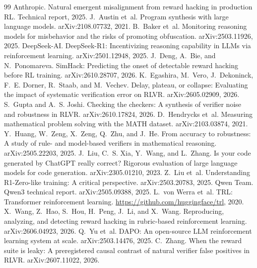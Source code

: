 \documentclass[11pt]{article}
\begin{document}

\begin{thebibliography}{99}
 Anthropic. Natural emergent misalignment from reward hacking in production RL. Technical report, 2025.
 J.~Austin et~al. Program synthesis with large language models. arXiv:2108.07732, 2021.
 B.~Baker et~al. Monitoring reasoning models for misbehavior and the risks of promoting obfuscation. arXiv:2503.11926, 2025.
 DeepSeek-AI. DeepSeek-R1: Incentivizing reasoning capability in LLMs via reinforcement learning. arXiv:2501.12948, 2025.
 J.~Deng, A.~Bie, and N.~Ponomareva. SimHack: Predicting the onset of detectable reward hacking before RL training. arXiv:2610.28707, 2026.
 K.~Egashira, M.~Vero, J.~Dekoninck, F.~E. Dorner, R.~Staab, and M.~Vechev. Delay, plateau, or collapse: Evaluating the impact of systematic verification error on RLVR. arXiv:2605.02909, 2026.
 S.~Gupta and A.~S. Joshi. Checking the checkers: A synthesis of verifier noise and robustness in RLVR. arXiv:2610.17824, 2026.
 D.~Hendrycks et~al. Measuring mathematical problem solving with the MATH dataset. arXiv:2103.03874, 2021.
 Y.~Huang, W.~Zeng, X.~Zeng, Q.~Zhu, and J.~He. From accuracy to robustness: A study of rule- and model-based verifiers in mathematical reasoning. arXiv:2505.22203, 2025.
 J.~Liu, C.~S. Xia, Y.~Wang, and L.~Zhang. Is your code generated by ChatGPT really correct? Rigorous evaluation of large language models for code generation. arXiv:2305.01210, 2023.
 Z.~Liu et~al. Understanding R1-Zero-like training: A critical perspective. arXiv:2503.20783, 2025.
 Qwen Team. Qwen3 technical report. arXiv:2505.09388, 2025.
 L.~von Werra et~al. TRL: Transformer reinforcement learning. \url{https://github.com/huggingface/trl}, 2020.
 X.~Wang, Z.~Hao, S.~Hou, H.~Peng, J.~Li, and X.~Wang. Reproducing, analyzing, and detecting reward hacking in rubric-based reinforcement learning. arXiv:2606.04923, 2026.
 Q.~Yu et~al. DAPO: An open-source LLM reinforcement learning system at scale. arXiv:2503.14476, 2025.
 C.~Zhang. When the reward suite is leaky: A preregistered causal contrast of natural verifier false positives in RLVR. arXiv:2607.11022, 2026.
\end{thebibliography}
\end{document}
